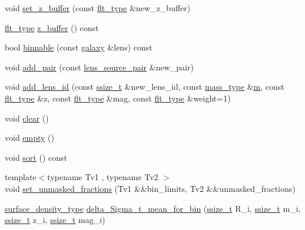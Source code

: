 \begin{DoxyCompactItemize}
void \hyperlink{classIceBRG_1_1pair__binner_a1785f044a69bdd9376d63843248e4c17}{set\+\_\+z\+\_\+buffer} (const \hyperlink{lib_2IceBRG__main_2common_8h_ad0f130a56eeb944d9ef2692ee881ecc4}{flt\+\_\+type} \&new\+\_\+z\+\_\+buffer)
\item 
\hyperlink{lib_2IceBRG__main_2common_8h_ad0f130a56eeb944d9ef2692ee881ecc4}{flt\+\_\+type} \hyperlink{classIceBRG_1_1pair__binner_afc88be4e3536fd0f73538d2a368b1b27}{z\+\_\+buffer} () const 
\item 
bool \hyperlink{classIceBRG_1_1pair__binner_a3d0bc270b81bdf3d0fd7f5098448e7ba}{binnable} (const \hyperlink{classIceBRG_1_1galaxy}{galaxy} \&lens) const 
\item 
void \hyperlink{classIceBRG_1_1pair__binner_a8a4c12129a660eb007da7d2c8aaa1224}{add\+\_\+pair} (const \hyperlink{classIceBRG_1_1lens__source__pair}{lens\+\_\+source\+\_\+pair} \&new\+\_\+pair)
\item 
void \hyperlink{classIceBRG_1_1pair__binner_a98d977adcf1255e16c26348f1c2fe5cd}{add\+\_\+lens\+\_\+id} (const \hyperlink{lib_2IceBRG__main_2common_8h_ab322a3e50421dc5f0c43316b1b373592}{ssize\+\_\+t} \&new\+\_\+lens\+\_\+id, const \hyperlink{namespaceIceBRG_a1be72ac4918a9b029f2eefa084213e35}{mass\+\_\+type} \&\hyperlink{namespaceIceBRG_ada6365c5d16106f0608afbd34f010bcc}{m}, const \hyperlink{lib_2IceBRG__main_2common_8h_ad0f130a56eeb944d9ef2692ee881ecc4}{flt\+\_\+type} \&z, const \hyperlink{lib_2IceBRG__main_2common_8h_ad0f130a56eeb944d9ef2692ee881ecc4}{flt\+\_\+type} \&mag, const \hyperlink{lib_2IceBRG__main_2common_8h_ad0f130a56eeb944d9ef2692ee881ecc4}{flt\+\_\+type} \&weight=1)
\item 
void \hyperlink{classIceBRG_1_1pair__binner_a25c3cddd7575cb0012a301772770027d}{clear} ()
\item 
void \hyperlink{classIceBRG_1_1pair__binner_a01b62fd022293870317bbcb3d8a809ff}{empty} ()
\item 
void \hyperlink{classIceBRG_1_1pair__binner_ae164bdb3724a73f199ecdd7b4c878ee7}{sort} () const 
\item 
{\footnotesize template$<$typename Tv1 , typename Tv2 $>$ }\\void \hyperlink{classIceBRG_1_1pair__binner_aa2ab94f5347d9af9ef901fbe9519d15e}{set\+\_\+unmasked\+\_\+fractions} (Tv1 \&\&bin\+\_\+limits, Tv2 \&\&unmasked\+\_\+fractions)
\item 
\hyperlink{namespaceIceBRG_a80c597ef5ba0a32491d32a9f0083b02d}{surface\+\_\+density\+\_\+type} \hyperlink{classIceBRG_1_1pair__binner_a00a64eeb64d7d7c2bd2587371ade8a0c}{delta\+\_\+\+Sigma\+\_\+t\+\_\+mean\+\_\+for\+\_\+bin} (\hyperlink{lib_2IceBRG__main_2common_8h_ab322a3e50421dc5f0c43316b1b373592}{ssize\+\_\+t} R\+\_\+i, \hyperlink{lib_2IceBRG__main_2common_8h_ab322a3e50421dc5f0c43316b1b373592}{ssize\+\_\+t} m\+\_\+i, \hyperlink{lib_2IceBRG__main_2common_8h_ab322a3e50421dc5f0c43316b1b373592}{ssize\+\_\+t} z\+\_\+i, \hyperlink{lib_2IceBRG__main_2common_8h_ab322a3e50421dc5f0c43316b1b373592}{ssize\+\_\+t} mag\+\_\+i)

\end{DoxyCompactItemize}
